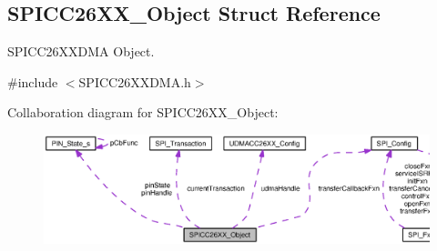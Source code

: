 \subsection{S\-P\-I\-C\-C26\-X\-X\-\_\-\-Object Struct Reference}
\label{struct_s_p_i_c_c26_x_x___object}


S\-P\-I\-C\-C26\-X\-X\-D\-M\-A Object.  




{\ttfamily \#include $<$S\-P\-I\-C\-C26\-X\-X\-D\-M\-A.\-h$>$}



Collaboration diagram for S\-P\-I\-C\-C26\-X\-X\-\_\-\-Object\-:
\nopagebreak
\begin{figure}[H]
\begin{center}
\leavevmode
\includegraphics[width=350pt]{struct_s_p_i_c_c26_x_x___object__coll__graph}
\end{center}
\end{figure}

